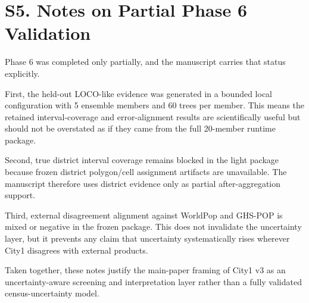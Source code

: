 \section{S5. Notes on Partial Phase 6 Validation}

Phase 6 was completed only partially, and the manuscript carries that status explicitly.

First, the held-out LOCO-like evidence was generated in a bounded local configuration with 5 ensemble members and 60 trees per member. This means the retained interval-coverage and error-alignment results are scientifically useful but should not be overstated as if they came from the full 20-member runtime package.

Second, true district interval coverage remains blocked in the light package because frozen district polygon/cell assignment artifacts are unavailable. The manuscript therefore uses district evidence only as partial after-aggregation support.

Third, external disagreement alignment against WorldPop and GHS-POP is mixed or negative in the frozen package. This does not invalidate the uncertainty layer, but it prevents any claim that uncertainty systematically rises wherever City1 disagrees with external products.

Taken together, these notes justify the main-paper framing of City1 v3 as an uncertainty-aware screening and interpretation layer rather than a fully validated census-uncertainty model.

